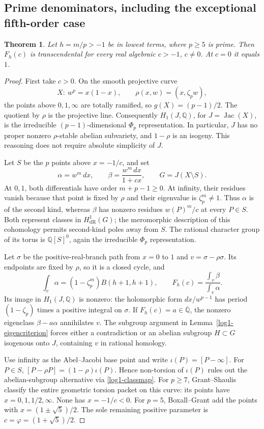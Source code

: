 \documentclass[11pt,a4paper]{article}
\newtheorem{theorem}{Theorem}[section]
\theoremstyle{definition}
\theoremstyle{remark}
\numberwithin{equation}{section}
\begin{document}
\subsection{Prime denominators, including the exceptional fifth-order case}

\begin{theorem}\label{log1-prime}
Let $h=m/p>-1$ be in lowest terms, where $p\ge5$ is prime. Then
$F_h(c)$ is transcendental for every real algebraic $c>-1$, $c\ne0$.
At $c=0$ it equals $1$.
\end{theorem}
\begin{proof}
First take $c>0$. On the smooth projective curve
\[
 X:\ w^p=x(1-x),\qquad \rho(x,w)=(x,\zeta_p w),
\]
the points above $0,1,\infty$ are totally ramified, so
$g(X)=(p-1)/2$. The quotient by $\rho$ is the projective line.
Consequently $H_1(J,\mathbb Q)$, for $J=\operatorname{Jac}(X)$, is the
irreducible $(p-1)$-dimensional $\Phi_p$ representation. In particular,
$J$ has no proper nonzero $\rho$-stable abelian subvariety, and
$1-\rho$ is an isogeny. This reasoning does not require absolute
simplicity of $J$.

Let $S$ be the $p$ points above $x=-1/c$, and set
\[
 \alpha=w^m\,dx,\qquad \beta=\frac{w^m\,dx}{1+cx},\qquad
 G=J(X\setminus S).
\]
At $0,1$, both differentials have order $m+p-1\ge0$. At infinity,
their residues vanish because that point is fixed by $\rho$ and their
eigenvalue is $\zeta_p^m\ne1$. Thus $\alpha$ is of the second kind,
whereas $\beta$ has nonzero residues $w(P)^m/c$ at every $P\in S$.
Both represent classes in $H^1_{\mathrm{dR}}(G)$; the meromorphic
description of this cohomology permits second-kind poles away from $S$.
The rational character group of its torus is $\mathbb Q[S]^0$, again
the irreducible $\Phi_p$ representation.

Let $\sigma$ be the positive-real-branch path from $x=0$ to $1$ and
$v=\sigma-\rho\sigma$. Its endpoints are fixed by $\rho$, so it is a
closed cycle, and
\[
 \int_v\alpha=(1-\zeta_p^m)B(h+1,h+1),\qquad
 F_h(c)=\frac{\int_v\beta}{\int_v\alpha}.
\]
Its image in $H_1(J,\mathbb Q)$ is nonzero: the holomorphic form
$dx/w^{p-1}$ has period $(1-\zeta_p)$ times a positive integral on
$\sigma$. If $F_h(c)=a\in\overline{\mathbb Q}$, the nonzero eigenclass
$\beta-a\alpha$ annihilates $v$. The subgroup argument in
Lemma~\ref{log1-eigencriterion} forces either a contradiction or an
abelian subgroup $H\subset G$ isogenous onto $J$, containing $v$ in
rational homology.

Use infinity as the Abel--Jacobi base point and write
$\iota(P)=[P-\infty]$. For $P\in S$,
$[P-\rho P]=(1-\rho)\iota(P)$. Hence non-torsion of $\iota(P)$ rules
out the abelian-subgroup alternative via \eqref{log1-classmap}.
For $p\ge7$, Grant--Shaulis \cite[Theorem~1.1]{log1-grant-shaulis}
classify the entire geometric torsion packet on this curve: its points
have $x=0,1,1/2,\infty$. None has $x=-1/c<0$.
For $p=5$, Boxall--Grant \cite[Theorem~0.2]{log1-boxall-grant} add the
points with $x=(1\pm\sqrt5)/2$. The sole remaining positive parameter
is $c=\varphi=(1+\sqrt5)/2$.


\end{proof}
\end{document}
